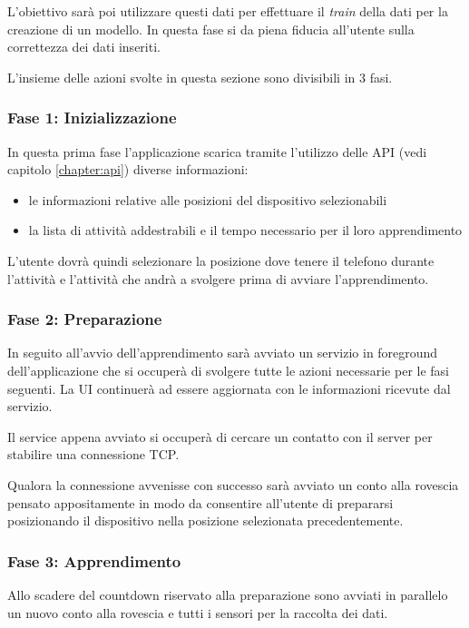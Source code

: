 L'obiettivo sarà poi utilizzare questi dati per effettuare il \textit{train} della dati per la creazione di un modello. In questa fase si da 
piena fiducia all'utente sulla correttezza dei dati inseriti.

L'insieme delle azioni svolte in questa sezione sono divisibili in 3 fasi.

\subsubsection{Fase 1: Inizializzazione}
In questa prima fase l'applicazione scarica tramite l'utilizzo delle API (vedi capitolo \ref{chapter:api}) diverse informazioni:
\begin{itemize}
    \item le informazioni relative alle posizioni del dispositivo selezionabili
    \item la lista di attività addestrabili e il tempo necessario per il loro apprendimento
\end{itemize}

L'utente dovrà quindi selezionare la posizione dove tenere il telefono durante l'attività e l'attività che andrà a svolgere 
prima di avviare l'apprendimento.

\subsubsection{Fase 2: Preparazione}
In seguito all'avvio dell'apprendimento sarà avviato un servizio in foreground \cite{services} dell'applicazione che si occuperà di svolgere 
tutte le azioni necessarie per le fasi seguenti. La UI continuerà ad essere aggiornata con le informazioni ricevute dal servizio.

Il service appena avviato si occuperà di cercare un contatto con il server per stabilire una connessione TCP.

Qualora la connessione avvenisse con successo sarà avviato un conto alla rovescia pensato appositamente in modo da consentire all'utente 
di prepararsi posizionando il dispositivo nella posizione selezionata precedentemente.

\subsubsection{Fase 3: Apprendimento}
Allo scadere del countdown riservato alla preparazione sono avviati in parallelo un nuovo conto alla rovescia 
e tutti i sensori  per la raccolta dei dati.

